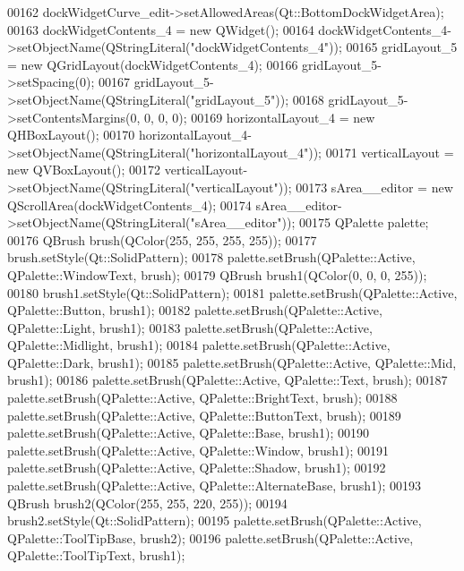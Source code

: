 \begin{DoxyCode}
00162         dockWidgetCurve\_edit->setAllowedAreas(Qt::BottomDockWidgetArea);
00163         dockWidgetContents\_4 = \textcolor{keyword}{new} QWidget();
00164         dockWidgetContents\_4->setObjectName(QStringLiteral(\textcolor{stringliteral}{"dockWidgetContents\_4"}));
00165         gridLayout\_5 = \textcolor{keyword}{new} QGridLayout(dockWidgetContents\_4);
00166         gridLayout\_5->setSpacing(0);
00167         gridLayout\_5->setObjectName(QStringLiteral(\textcolor{stringliteral}{"gridLayout\_5"}));
00168         gridLayout\_5->setContentsMargins(0, 0, 0, 0);
00169         horizontalLayout\_4 = \textcolor{keyword}{new} QHBoxLayout();
00170         horizontalLayout\_4->setObjectName(QStringLiteral(\textcolor{stringliteral}{"horizontalLayout\_4"}));
00171         verticalLayout = \textcolor{keyword}{new} QVBoxLayout();
00172         verticalLayout->setObjectName(QStringLiteral(\textcolor{stringliteral}{"verticalLayout"}));
00173         sArea\_\_editor = \textcolor{keyword}{new} QScrollArea(dockWidgetContents\_4);
00174         sArea\_\_editor->setObjectName(QStringLiteral(\textcolor{stringliteral}{"sArea\_\_editor"}));
00175         QPalette palette;
00176         QBrush brush(QColor(255, 255, 255, 255));
00177         brush.setStyle(Qt::SolidPattern);
00178         palette.setBrush(QPalette::Active, QPalette::WindowText, brush);
00179         QBrush brush1(QColor(0, 0, 0, 255));
00180         brush1.setStyle(Qt::SolidPattern);
00181         palette.setBrush(QPalette::Active, QPalette::Button, brush1);
00182         palette.setBrush(QPalette::Active, QPalette::Light, brush1);
00183         palette.setBrush(QPalette::Active, QPalette::Midlight, brush1);
00184         palette.setBrush(QPalette::Active, QPalette::Dark, brush1);
00185         palette.setBrush(QPalette::Active, QPalette::Mid, brush1);
00186         palette.setBrush(QPalette::Active, QPalette::Text, brush);
00187         palette.setBrush(QPalette::Active, QPalette::BrightText, brush);
00188         palette.setBrush(QPalette::Active, QPalette::ButtonText, brush);
00189         palette.setBrush(QPalette::Active, QPalette::Base, brush1);
00190         palette.setBrush(QPalette::Active, QPalette::Window, brush1);
00191         palette.setBrush(QPalette::Active, QPalette::Shadow, brush1);
00192         palette.setBrush(QPalette::Active, QPalette::AlternateBase, brush1);
00193         QBrush brush2(QColor(255, 255, 220, 255));
00194         brush2.setStyle(Qt::SolidPattern);
00195         palette.setBrush(QPalette::Active, QPalette::ToolTipBase, brush2);
00196         palette.setBrush(QPalette::Active, QPalette::ToolTipText, brush1);

\end{DoxyCode}
